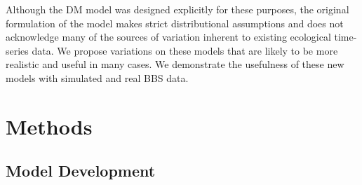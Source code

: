\documentclass[12pt]{article}
\begin{document}
Although the DM model was designed explicitly for these purposes, the
original formulation of the model makes strict distributional
assumptions and does not acknowledge many of the sources of variation
inherent to existing ecological time-series data.  We propose
variations on these models that are likely to be more realistic and
useful in many cases.  We demonstrate the usefulness of these new
models with simulated and real BBS data.


\section{Methods}

\subsection{Model Development}
\end{document}
